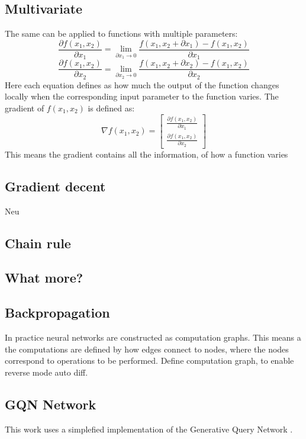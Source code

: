 \documentclass[a4paper, twoside, 10pt]{report}
\begin{document}
\subsection{Multivariate}
The same can be applied to functions with multiple parameters:
\begin{equation}
\frac{\partial f(x_1, x_2)}{\partial x_1} = \lim_{\partial x_1 \to 0}\frac{f(x_1, x_2 + \partial x_1) - f(x_1, x_2)}{\partial x_1}
\end{equation}
\begin{equation}
\frac{\partial f(x_1, x_2)}{\partial x_2} = \lim_{\partial x_2 \to 0}\frac{f(x_1, x_2 + \partial x_2) - f(x_1, x_2)}{\partial x_2}
\end{equation}
Here each equation defines as how much the output of the function changes locally when the corresponding input parameter to the function varies.
The gradient of $f(x_1, x_2)$ is defined as:
\begin{equation}
\nabla f(x_1, x_2) = 
	\begin{bmatrix}
	\frac{\partial f(x_1, x_2)}{\partial x_1} \\[2mm]
	\frac{\partial f(x_1, x_2)}{\partial x_2}
	\end{bmatrix}
\end{equation}
This means the gradient contains all the information, of how a function varies

\subsection{Gradient decent}
Neu

\subsection{Chain rule}
\subsection{What more?}


\subsection{Backpropagation}
In practice neural networks are constructed as computation graphs. This means a the computations are defined by how edges connect to nodes, where the nodes correspond to operations to be performed.
Define computation graph, to enable reverse mode auto diff.

\subsection{GQN Network}
This work uses a simplefied implementation of the Generative Query Network \cite{gqn}.
\end{document}
